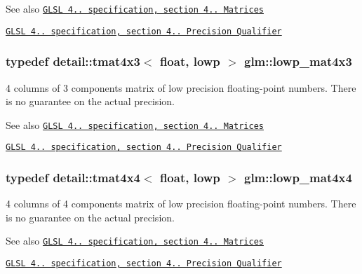 \begin{DoxySeeAlso}{See also}
\href{http://www.opengl.org/registry/doc/GLSLangSpec.4.20.8.pdf}{\tt G\+L\+SL 4.. specification, section 4.. Matrices} 

\href{http://www.opengl.org/registry/doc/GLSLangSpec.4.20.8.pdf}{\tt G\+L\+SL 4.. specification, section 4.. Precision Qualifier} 
\end{DoxySeeAlso}
\subsubsection[{\texorpdfstring{lowp\+\_\+mat4x3}{lowp_mat4x3}}]{\setlength{\rightskip}{0pt plus 5cm}typedef detail\+::tmat4x3$<$ float, lowp $>$ {\bf glm\+::lowp\+\_\+mat4x3}}\hypertarget{group__core__precision_gada92d0baf15002240dd6f638c57f9fec}{}\label{group__core__precision_gada92d0baf15002240dd6f638c57f9fec}
4 columns of 3 components matrix of low precision floating-\/point numbers. There is no guarantee on the actual precision.

\begin{DoxySeeAlso}{See also}
\href{http://www.opengl.org/registry/doc/GLSLangSpec.4.20.8.pdf}{\tt G\+L\+SL 4.. specification, section 4.. Matrices} 

\href{http://www.opengl.org/registry/doc/GLSLangSpec.4.20.8.pdf}{\tt G\+L\+SL 4.. specification, section 4.. Precision Qualifier} 
\end{DoxySeeAlso}
\subsubsection[{\texorpdfstring{lowp\+\_\+mat4x4}{lowp_mat4x4}}]{\setlength{\rightskip}{0pt plus 5cm}typedef detail\+::tmat4x4$<$ float, lowp $>$ {\bf glm\+::lowp\+\_\+mat4x4}}\hypertarget{group__core__precision_gad31846a0565c22a0479950313c28b218}{}\label{group__core__precision_gad31846a0565c22a0479950313c28b218}
4 columns of 4 components matrix of low precision floating-\/point numbers. There is no guarantee on the actual precision.

\begin{DoxySeeAlso}{See also}
\href{http://www.opengl.org/registry/doc/GLSLangSpec.4.20.8.pdf}{\tt G\+L\+SL 4.. specification, section 4.. Matrices} 

\href{http://www.opengl.org/registry/doc/GLSLangSpec.4.20.8.pdf}{\tt G\+L\+SL 4.. specification, section 4.. Precision Qualifier} 
\end{DoxySeeAlso}
